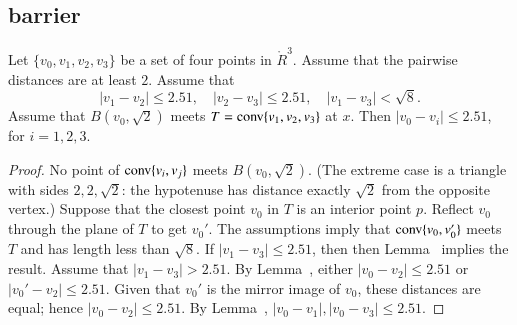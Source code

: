 \newpage



\subsection{barrier}




\begin{lemma}
Let $\{v_0,v_1,v_2,v_3\}$ be a set of four points in $\ring{R}^3$.
Assume that the pairwise distances are at least $2$.  Assume
that 
$$
   |v_1-v_2|\le 2.51,\quad |v_2-v_3|\le 2.51,\quad |v_1-v_3|<\sqrt8.
$$
Assume that $B(v_0,\sqrt2)$ meets $T={\operatorname{conv}}\{v_1,v_2,v_3\}$ at $x$.
Then $|v_0-v_i|\le 2.51$, for $i=1,2,3$.
\end{lemma}


\begin{proof}
No point of ${\operatorname{conv}}\{v_i,v_j\}$ meets $B(v_0,\sqrt2)$.  (The
extreme case is a triangle with sides $2,2,\sqrt2$: the hypotenuse
has distance exactly $\sqrt2$ from the opposite vertex.)
Suppose that the closest point $v_0$ in
$T$ is an interior point $p$. Reflect $v_0$
through the plane of $T$ to get $v_0'$. The assumptions imply
that ${\operatorname{conv}}\{v_0,v_0'\}$ meets $T$ and has
length less than $\sqrt8$. If $|v_1-v_3|\le2.51$, then
then Lemma~ implies the result.
Assume that $|v_1-v_3|>2.51$.
By Lemma~,  
either $|v_0-v_2|\le2.51$ or $|v_0'-v_2|\le 2.51$.  Given that
$v_0'$ is the mirror image of $v_0$, these distances are equal;
hence $|v_0-v_2|\le 2.51$.  By Lemma~,
$|v_0-v_1|,|v_0-v_3|\le 2.51$.
\end{proof}


